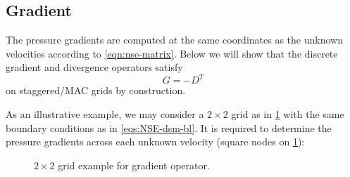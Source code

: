 \documentclass{article}
\numberwithin{equation}{section}
\begin{document}
\subsection{Gradient}\label{subsec:gradient} 

The pressure gradients are computed at the same coordinates as the unknown velocities according to \cref{eqn:nse-matrix}. Below we will show that the discrete gradient and divergence operators satisfy
\begin{equation}\label{eqn:g-dt}
  {G}=-{D^T}
\end{equation}
on staggered/MAC grids by construction. 

As an illustrative example, we may consider a $2\times 2$ grid as in \cref{fig:G-example-2x2} with the same boundary conditions as in \cref{eqs:NSE-dsm-bl}. It is required to determine the pressure gradients across each unknown velocity (square nodes on \cref{fig:G-example-2x2}):

\begin{figure}[H] %
  \caption{$2\times 2$ grid example for gradient operator.}\label{fig:G-example-2x2}
\end{figure}
\end{document}

